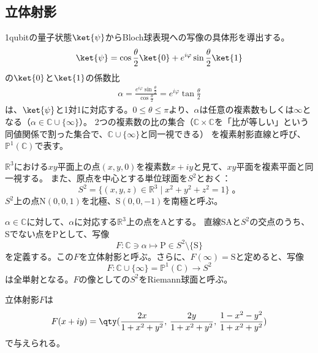 \documentclass[a4paper,11pt,uplatex]{jsarticle}%
\begin{document}
\subsection{立体射影}
1qubitの量子状態$\ket{\psi}$からBloch球表現への写像の具体形を導出する。
\begin{equation}
  \ket{\psi}=\cos\frac{\theta}{2}\ket{0}+e^{i\varphi}\sin\frac{\theta}{2}\ket{1}
\end{equation}
の$\ket{0}$と$\ket{1}$の係数比
\begin{eqnarray}
  \alpha=\frac{e^{i\varphi}\sin\frac{\theta}{2}}{\cos\frac{\theta}{2}} = e^{i\varphi}\tan\frac{\theta}{2}
\end{eqnarray}
は、$\ket{\psi}$と1対1に対応する。$0\leq\theta\leq\pi$より、$\alpha$は任意の複素数もしくは$\infty$となる（$\alpha\in\mathbb{C}\cup\{\infty\}$）。
2つの複素数の比の集合（$\mathbb{C}\times\mathbb{C}$を「比が等しい」という同値関係で割った集合で、$\mathbb{C}\cup\{\infty\}$と同一視できる）
を複素射影直線と呼び、$\mathbb{P}^1(\mathbb{C})$で表す。

$\mathbb{R}^3$における$xy$平面上の点$(x,y,0)$を複素数$x+iy$と見て、$xy$平面を複素平面と同一視する。
また、原点を中心とする単位球面を$S^2$とおく：
\begin{equation}
  S^2=\{(x,y,z)\in\mathbb{R}^3\mid x^2+y^2+z^2=1\}\;。
\end{equation}
$S^2$上の点N$(0,0,1)$を北極、S$(0,0,-1)$を南極と呼ぶ。

$\alpha\in\mathbb{C}$に対して、$\alpha$に対応する$\mathbb{R}^3$上の点をAとする。
直線SAと$S^2$の交点のうち、Sでない点をPとして、写像
\begin{equation}
  F\colon \mathbb{C}\ni\alpha\longmapsto \text{P}\in S^2\setminus\{\text{S}\}
\end{equation}
を定義する。この$F$を立体射影と呼ぶ。さらに、$F(\infty)=\text{S}$と定めると、写像
\begin{equation}
  F\colon \mathbb{C}\cup\{\infty\} = \mathbb{P}^{1}(\mathbb{C})\longrightarrow S^2
\end{equation}
は全単射となる。$F$の像としての$S^2$をRiemann球面と呼ぶ。

\newpage
\begin{tcolorbox}[
colback = white,
colframe = green!35!black,
fonttitle = \bfseries]
\begin{theorem}[立体射影の表現]
立体射影$F$は
\begin{equation}
  F(x+iy)=\qty(\frac{2x}{1+x^2+y^2},\,\frac{2y}{1+x^2+y^2},\,\frac{1-x^2-y^2}{1+x^2+y^2})
\end{equation}
で与えられる。
\end{theorem}
\end{tcolorbox}
\end{document}

